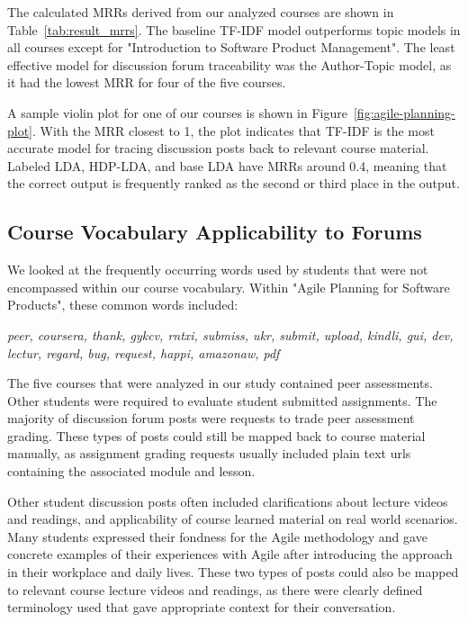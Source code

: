 \documentclass[sigconf, nonacm=true]{acmart}
\begin{document}
The calculated MRRs derived from our analyzed courses are shown in Table~\ref{tab:result_mrrs}.
The baseline TF-IDF model outperforms topic models in all courses except for "Introduction to Software Product Management".
The least effective model for discussion forum traceability was the Author-Topic model, as it had the lowest MRR for four of the five courses.

A sample violin plot for one of our courses is shown in Figure~\ref{fig:agile-planning-plot}. %
With the MRR closest to 1, the plot indicates that TF-IDF is the most accurate model for tracing discussion posts back to relevant course material.
Labeled LDA, HDP-LDA, and base LDA have MRRs around 0.4, meaning that the correct output is frequently ranked as the second or third place in the output.

\subsection{Course Vocabulary Applicability to Forums}
We looked at the frequently occurring words used by students that were not encompassed within our course vocabulary. Within "Agile Planning for Software Products", these common words included:

\begin{center}
\emph{
    peer, coursera, thank, gykcv, rntxi, submiss, ukr, submit, upload, kindli, gui, dev, lectur, regard, bug, request, happi, amazonaw, pdf
}
\end{center}

The five courses that were analyzed in our study contained peer assessments.
Other students were required to evaluate student submitted assignments.
The majority of discussion forum posts were requests to trade peer assessment grading.
These types of posts could still be mapped back to course material manually, as  assignment grading requests usually included plain text urls containing the associated module and lesson.

Other student discussion posts often included clarifications about lecture videos and readings, and applicability of course learned material on real world scenarios.
Many students expressed their fondness for the Agile methodology and gave concrete examples of their experiences with Agile after introducing the approach in their workplace and daily lives.
These two types of posts could also be mapped to relevant course lecture videos and readings, as there were clearly defined terminology used that gave appropriate context for their conversation.
\end{document}
